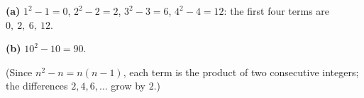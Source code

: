 \textbf{(a)} $1^2-1=0$, $2^2-2=2$, $3^2-3=6$, $4^2-4=12$: the first four terms are $\boxed{0,\ 2,\ 6,\ 12}$.

\textbf{(b)} $10^2-10=\boxed{90}$.

(Since $n^2-n=n(n-1)$, each term is the product of two consecutive integers; the differences $2,4,6,\dots$ grow by $2$.)
